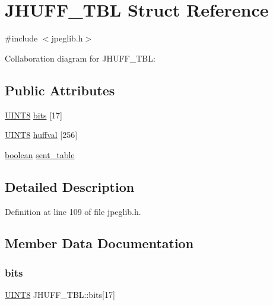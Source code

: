 \hypertarget{structJHUFF__TBL}{}\section{J\+H\+U\+F\+F\+\_\+\+T\+BL Struct Reference}
\label{structJHUFF__TBL}


{\ttfamily \#include $<$jpeglib.\+h$>$}



Collaboration diagram for J\+H\+U\+F\+F\+\_\+\+T\+BL\+:
\subsection*{Public Attributes}
\begin{DoxyCompactItemize}
\item 
\mbox{\hyperlink{jmorecfg_8h_adfb9a8ea1dd59f151065f763e1e9acd6}{U\+I\+N\+T8}} \mbox{\hyperlink{structJHUFF__TBL_a68b0ec25d6d06c13e0a4f74fbb683b3f}{bits}} \mbox{[}17\mbox{]}
\item 
\mbox{\hyperlink{jmorecfg_8h_adfb9a8ea1dd59f151065f763e1e9acd6}{U\+I\+N\+T8}} \mbox{\hyperlink{structJHUFF__TBL_a7aad276f6ced97323bb94ba5e6220961}{huffval}} \mbox{[}256\mbox{]}
\item 
\mbox{\hyperlink{jmorecfg_8h_a7c6368b321bd9acd0149b030bb8275ed}{boolean}} \mbox{\hyperlink{structJHUFF__TBL_a387c655e83d0d57c50802856d630f37b}{sent\+\_\+table}}
\end{DoxyCompactItemize}


\subsection{Detailed Description}


Definition at line 109 of file jpeglib.\+h.



\subsection{Member Data Documentation}
\mbox{\label{structJHUFF__TBL_a68b0ec25d6d06c13e0a4f74fbb683b3f}} 
\subsubsection{\texorpdfstring{bits}{bits}}
{\footnotesize\ttfamily \mbox{\hyperlink{jmorecfg_8h_adfb9a8ea1dd59f151065f763e1e9acd6}{U\+I\+N\+T8}} J\+H\+U\+F\+F\+\_\+\+T\+B\+L\+::bits\mbox{[}17\mbox{]}}



